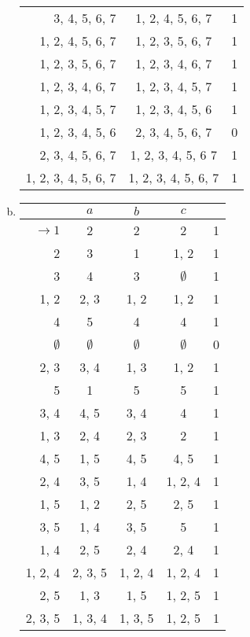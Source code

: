 \begin{solution}
\begin{enumerate}[(a)]
\begin{tabular}[t]{r c r}
            3, 4, 5, 6, 7 & 1, 2, 4, 5, 6, 7 & 1\\
            1, 2, 4, 5, 6, 7 & 1, 2, 3, 5, 6, 7 & 1\\
            1, 2, 3, 5, 6, 7 & 1, 2, 3, 4, 6, 7 & 1\\
            1, 2, 3, 4, 6, 7 & 1, 2, 3, 4, 5, 7 & 1\\
            1, 2, 3, 4, 5, 7 & 1, 2, 3, 4, 5, 6 & 1\\
            1, 2, 3, 4, 5, 6 & 2, 3, 4, 5, 6, 7 & 0\\
            2, 3, 4, 5, 6, 7 & 1, 2, 3, 4, 5, 6 7 & 1\\
            1, 2, 3, 4, 5, 6, 7 & 1, 2, 3, 4, 5, 6, 7 & 1
        \end{tabular}
        
        \item\begin{tabular}[t]{r c c c r}
            & \(a\) & \(b\) & \(c\) &\\\bottomrule
               \(\to1\) & 2 & 2 & 2 & 1\\
                2 & 3 & 1 & 1, 2 & 1\\
                3 & 4 & 3 & \(\emptyset \) & 1\\
                1, 2 & 2, 3 & 1, 2 & 1, 2 & 1\\
                4 & 5 & 4 & 4 & 1\\
                \(\emptyset \) & \(\emptyset \) & \(\emptyset \) & \(\emptyset \) & 0\\
                2, 3 & 3, 4 & 1, 3 & 1, 2 & 1\\
                5 & 1 & 5 & 5 & 1\\
                3, 4 & 4, 5 & 3, 4 & 4 & 1\\
                1, 3 & 2, 4 & 2, 3 & 2 & 1\\
                4, 5 & 1, 5 & 4, 5 & 4, 5 & 1\\
                2, 4 & 3, 5 & 1, 4 & 1, 2, 4 & 1\\
                1, 5 & 1, 2 & 2, 5 & 2, 5 & 1\\
                3, 5 & 1, 4 & 3, 5 & 5 & 1\\
                1, 4 & 2, 5 & 2, 4 & 2, 4 & 1\\
                1, 2, 4 & 2, 3, 5 & 1, 2, 4 & 1, 2, 4 & 1\\
                2, 5 & 1, 3 & 1, 5 & 1, 2, 5 & 1\\
                2, 3, 5 & 1, 3, 4 & 1, 3, 5 & 1, 2, 5 & 1\\

\end{tabular}
\end{enumerate}
\end{solution}
